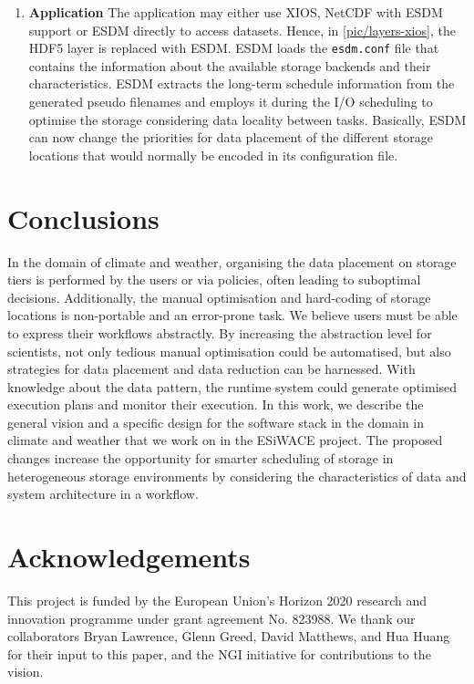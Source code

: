 \documentclass{superfri}
\begin{document}
\begin{enumerate}
  \item \textbf{Application}
  The application may either use XIOS, NetCDF with ESDM support or ESDM directly to access datasets.
  Hence, in \cref{pic/layers-xios}, the HDF5 layer is replaced with ESDM.
  ESDM loads the \texttt{esdm.conf} file that contains the information about the available storage backends and their characteristics.
  ESDM extracts the long-term schedule information from the generated pseudo filenames and employs it during the I/O scheduling to optimise the storage considering data locality between tasks.
  Basically, ESDM can now change the priorities for data placement of the different storage locations that would normally be encoded in its configuration file.
\end{enumerate}

\section{Conclusions}
\label{sec:conclusions}

In the domain of climate and weather, organising the data placement on storage tiers is performed by the users or via policies, often leading to suboptimal decisions.
Additionally, the manual optimisation and hard-coding of storage locations is non-portable and an error-prone task.
We believe users must be able to express their workflows abstractly.
By increasing the abstraction level for scientists, not only tedious manual optimisation could be automatised, but also strategies for data placement and data reduction can be harnessed.
With knowledge about the data pattern, the runtime system could generate optimised execution plans and monitor their execution.
In this work, we describe the general vision and a specific design for the software stack in the domain in climate and weather that we work on in the ESiWACE project.
The proposed changes increase the opportunity for smarter scheduling of storage in heterogeneous storage environments by considering the characteristics of data and system architecture in a workflow.

\section*{Acknowledgements}

\small
This project is funded by the European Union's Horizon 2020 research and innovation programme under grant agreement No. 823988.
We thank our collaborators Bryan Lawrence, Glenn Greed, David Matthews, and Hua Huang for their input to this paper, and the NGI initiative for contributions to the vision.

\openaccess


\end{document}
